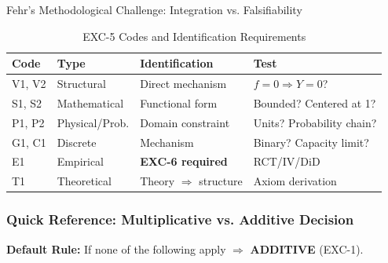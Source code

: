 \begin{chapter}{Fehr's Methodological Challenge: Integration vs. Falsifiability}
\begin{table}[h!]
\centering
\caption{EXC-5 Codes and Identification Requirements}
\label{tab:exc5-identification}
\renewcommand{\arraystretch}{1.2}
\small
\begin{tabular}{@{}llll@{}}
\toprule
\textbf{Code} & \textbf{Type} & \textbf{Identification} & \textbf{Test} \\
\midrule
V1, V2 & Structural & Direct mechanism & $f=0 \Rightarrow Y=0$? \\
S1, S2 & Mathematical & Functional form & Bounded? Centered at 1? \\
P1, P2 & Physical/Prob. & Domain constraint & Units? Probability chain? \\
G1, C1 & Discrete & Mechanism & Binary? Capacity limit? \\
E1 & Empirical & \textbf{EXC-6 required} & RCT/IV/DiD \\
T1 & Theoretical & Theory $\Rightarrow$ structure & Axiom derivation \\
\bottomrule
\end{tabular}
\end{table}

\subsubsection{Quick Reference: Multiplicative vs. Additive Decision}

\begin{tcolorbox}[colback=yellow!5!white,colframe=orange!75!black,title=Decision Flowchart: When to Use Multiplicative]
\textbf{Default Rule:} If none of the following apply $\Rightarrow$ \textbf{ADDITIVE} (EXC-1).


\end{tcolorbox}
\end{chapter}
